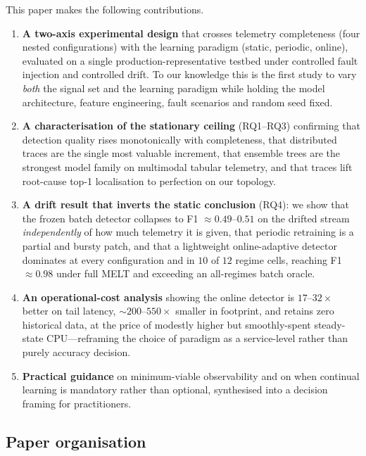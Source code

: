 \documentclass[acmsmall]{acmart}
\begin{document}
This paper makes the following contributions.

\begin{enumerate}
  \item \textbf{A two-axis experimental design} that crosses telemetry completeness (four nested configurations) with the learning paradigm (static, periodic, online), evaluated on a single production-representative testbed under controlled fault injection and controlled drift. To our knowledge this is the first study to vary \emph{both} the signal set and the learning paradigm while holding the model architecture, feature engineering, fault scenarios and random seed fixed.

  \item \textbf{A characterisation of the stationary ceiling} (RQ1--RQ3) confirming that detection quality rises monotonically with completeness, that distributed traces are the single most valuable increment, that ensemble trees are the strongest model family on multimodal tabular telemetry, and that traces lift root-cause top-1 localisation to perfection on our topology.

  \item \textbf{A drift result that inverts the static conclusion} (RQ4): we show that the frozen batch detector collapses to F1 $\approx 0.49$--$0.51$ on the drifted stream \emph{independently} of how much telemetry it is given, that periodic retraining is a partial and bursty patch, and that a lightweight online-adaptive detector dominates at every configuration and in $10$ of $12$ regime cells, reaching F1 $\approx 0.98$ under full MELT and exceeding an all-regimes batch oracle.

  \item \textbf{An operational-cost analysis} showing the online detector is $17$--$32\times$ better on tail latency, $\sim 200$--$550\times$ smaller in footprint, and retains zero historical data, at the price of modestly higher but smoothly-spent steady-state CPU---reframing the choice of paradigm as a service-level rather than purely accuracy decision.

  \item \textbf{Practical guidance} on minimum-viable observability and on when continual learning is mandatory rather than optional, synthesised into a decision framing for practitioners.
\end{enumerate}

\subsection{Paper organisation}\label{sec:organisation}
\end{document}
